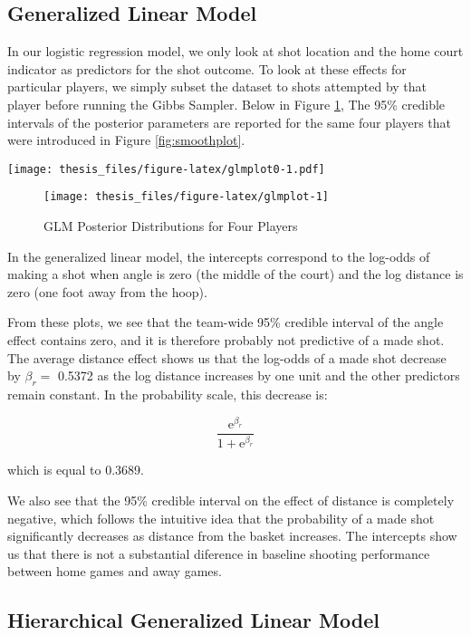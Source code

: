 \documentclass[12pt,twoside]{dukestatscithesis}
\theoremstyle{definition}
\theoremstyle{definition}
\theoremstyle{definition}
\theoremstyle{remark}
\begin{document}
\subsection{Generalized Linear Model}\label{generalized-linear-model-1}

In our logistic regression model, we only look at shot location and the
home court indicator as predictors for the shot outcome. To look at
these effects for particular players, we simply subset the dataset to
shots attempted by that player before running the Gibbs Sampler. Below
in Figure \ref{fig:glmplot}, The 95\% credible intervals of the
posterior parameters are reported for the same four players that were
introduced in Figure \ref{fig:smoothplot}.

\texttt{[image: thesis\_files/figure-latex/glmplot0-1.pdf]}
\begin{figure}

\hfill{}\texttt{[image: thesis\_files/figure-latex/glmplot-1]} 

\caption{GLM Posterior Distributions for Four Players}\label{fig:glmplot}
\end{figure}
In the generalized linear model, the intercepts correspond to the
log-odds of making a shot when angle is zero (the middle of the court)
and the log distance is zero (one foot away from the hoop).

From these plots, we see that the team-wide 95\% credible interval of
the angle effect contains zero, and it is therefore probably not
predictive of a made shot. The average distance effect shows us that the
log-odds of a made shot decrease by \(\beta_r =\) 0.5372 as the log
distance increases by one unit and the other predictors remain constant.
In the probability scale, this decrease is:

\[
\frac{\text{e}^{\beta_r}}{1 + \text{e}^{\beta_r}} 
\]

which is equal to 0.3689.

We also see that the 95\% credible interval on the effect of distance is
completely negative, which follows the intuitive idea that the
probability of a made shot significantly decreases as distance from the
basket increases. The intercepts show us that there is not a substantial
diference in baseline shooting performance between home games and away
games.

\subsection{Hierarchical Generalized Linear
Model}\label{hierarchical-generalized-linear-model-1}
\end{document}
